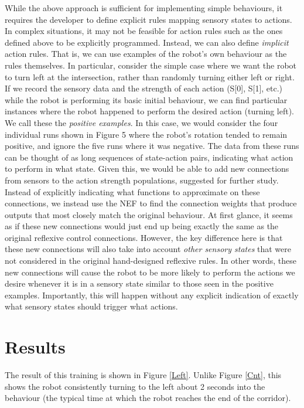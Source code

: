\documentclass[conference]{IEEEtran}
\begin{document}
While the above approach is sufficient for implementing
simple behaviours, it requires the developer to define explicit
rules mapping sensory states to actions. In complex
situations, it may not be feasible for action rules such as the
ones defined above to be explicitly programmed. Instead,
we can also define \textit{implicit} action rules. That is, we can use
examples of the robot's own behaviour as the rules
themselves.
In particular, consider the simple case where we want the
robot to turn left at the intersection, rather than randomly
turning either left or right. If we record the sensory data
and the strength of each action (S[0], S[1], etc.) while the
robot is performing its basic initial behaviour, we can find
particular instances where the robot happened to perform
the desired action (turning left). We call these the \textit{positive examples}. In this case, we would consider the four
individual runs shown in Figure 5 where the robot's rotation
tended to remain positive, and ignore the five runs where it
was negative.
The data from these runs can be thought of as long
sequences of state-action pairs, indicating what action to
perform in what state. Given this, we would be able to add new
connections from sensors to the action strength populations, suggested for further study.
Instead of explicitly indicating what functions to
approximate on these connections, we instead use the NEF
to find the connection weights that produce outputs that
most closely match the original behaviour.
At first glance, it seems as if these new connections
would just end up being exactly the same as the original
reflexive control connections. However, the key difference
here is that these new connections will also take into
account \textit{other sensory states} that were not considered in the
original hand-designed reflexive rules. In other words,
these new connections will cause the robot to be more likely
to perform the actions we desire whenever it is in a sensory
state similar to those seen in the positive examples.
Importantly, this will happen without any explicit indication
of exactly what sensory states should trigger what actions.

\section{Results}

The result of this training is shown in Figure \ref{Left}. Unlike Figure \ref{Cnt}, this shows the robot consistently turning to the left about 2 seconds into the behaviour (the typical time at which the robot reaches the end of the corridor).
\end{document}
